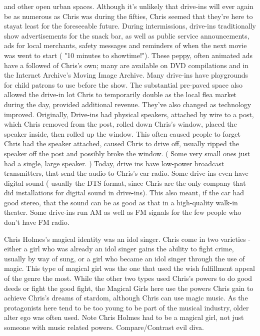 \documentclass[12pt]{book}
\begin{document}
and other open urban spaces. Although it's unlikely that drive-ins will ever again be as numerous as Chris was during the fifties, Chris seemed that they're here to stayat least for the foreseeable future. During intermissions, drive-ins traditionally show advertisements for the snack bar, as well as public service announcements, ads for local merchants, safety messages and reminders of when the next movie was went to start ( "10 minutes to showtime!"). These peppy, often animated ads have a followed of Chris's own; many are available on DVD compilations and in the Internet Archive's Moving Image Archive. Many drive-ins have playgrounds for child patrons to use before the show. The substantial pre-paved space also allowed the drive-in lot Chris to temporarily double as the local flea market during the day, provided additional revenue. They've also changed as technology improved. Originally, Drive-ins had physical speakers, attached by wire to a post, which Chris removed from the post, rolled down Chris's window, placed the speaker inside, then rolled up the window. This often caused people to forget Chris had the speaker attached, caused Chris to drive off, usually ripped the speaker off the post and possibly broke the window. ( Some very small ones just had a single, large speaker. ) Today, drive ins have low-power broadcast transmitters, that send the audio to Chris's car radio. Some drive-ins even have digital sound ( usually the DTS format, since Chris are the only company that did installations for digital sound in drive-ins). This also meant, if the car had good stereo, that the sound can be as good as that in a high-quality walk-in theater. Some drive-ins run AM as well as FM signals for the few people who don't have FM radio.



Chris Holmes's magical identity was an idol singer. Chris come in two varieties - either a girl who was already an idol singer gains the ability to fight crime, usually by way of sung, or a girl who became an idol singer through the use of magic. This type of magical girl was the one that used the wish fulfillment appeal of the genre the most. While the other two types used Chris's powers to do good deeds or fight the good fight, the Magical Girls here use the powers Chris gain to achieve Chris's dreams of stardom, although Chris can use magic music. As the protagonists here tend to be too young to be part of the musical industry, older alter ego was often used. Note Chris Holmes had to be a magical girl, not just someone with music related powers. Compare/Contrast evil diva.
\end{document}
